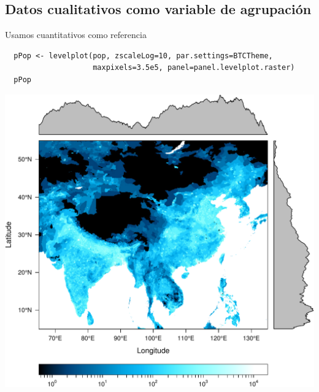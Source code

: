 \documentclass[xcolor={usenames,svgnames,dvipsnames}]{beamer}
\begin{document}
\subsection{Datos cualitativos como variable de agrupación}
\label{sec-3-3}
\begin{frame}[fragile,label=sec-3-3-1]{Usamos cuantitativos como referencia}
 \lstset{language=R,label= ,caption= ,numbers=none}
\begin{lstlisting}
  pPop <- levelplot(pop, zscaleLog=10, par.settings=BTCTheme,
                    maxpixels=3.5e5, panel=panel.levelplot.raster)
  pPop
\end{lstlisting}

\includegraphics[width=.9\linewidth]{figs/populationNASA.pdf}
\end{frame}
\end{document}
